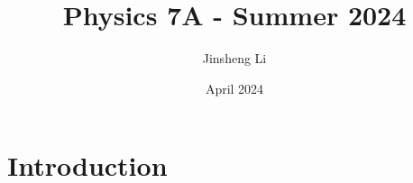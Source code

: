 \documentclass{article}
\title{Physics 7A - Summer 2024}
\author{Jinsheng Li}
\date{April 2024}
\begin{document}
\maketitle

\section{Introduction}
\end{document}
